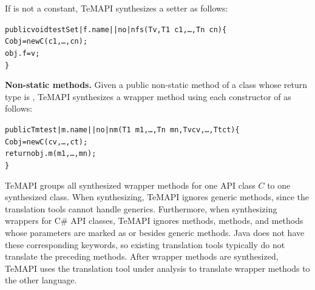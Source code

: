 If  is not a constant, TeMAPI synthesizes a setter as follows:

\begin{CodeOut}%
\begin{alltt}
 public void testSet|f.name||no|nfs(T v, T1\ c1,\ldots, Tn\ cn)\{
   C obj = new C(c1,\ldots, cn);
   obj.f = v;
 \}
\end{alltt}
\end{CodeOut}%

\textbf{Non-static methods.} Given a public non-static method  of a class  whose return type is , TeMAPI synthesizes a wrapper method using each constructor  of  as follows:

\begin{CodeOut}%
\begin{alltt}
 public Tm test|m.name||no|nm(T1\ m1,\ldots, Tn\ mn, Tv cv, \ldots, Tt ct)\{
   C obj = new C(cv,\ldots, ct);
   return obj.m(m1,\ldots, mn);
 \}
\end{alltt}
\end{CodeOut}%


TeMAPI groups all synthesized wrapper methods for one API class $C$ to one synthesized class. When synthesizing, TeMAPI ignores generic methods, since the translation tools cannot handle generics. Furthermore, when synthesizing wrappers for C\# API classes, TeMAPI ignores  methods,  methods, and methods whose parameters are marked as  or  besides generic methods. Java does not have these corresponding keywords, so existing translation tools typically do not translate the preceding methods. After wrapper methods are synthesized, TeMAPI uses the translation tool under analysis to translate wrapper methods to the other language.

